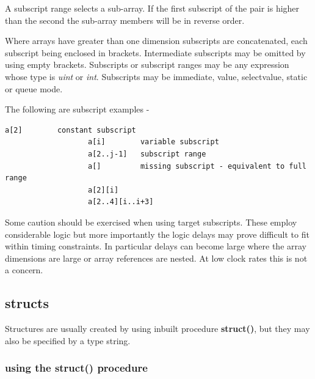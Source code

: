                A subscript range selects a sub-array.
                If the first subscript of the pair is higher than the second
                the sub-array members will be in reverse order.

                Where arrays have greater than one dimension subscripts are
                concatenated, each subscript being enclosed in brackets.
                Intermediate subscripts may be omitted by using empty brackets.
                Subscripts or subscript ranges may be any expression whose type
                is {\em uint} or {\em int}. Subscripts may be immediate, value,
                selectvalue, static or queue mode.
                             
                The following are subscript examples -
                \begin{lstlisting}[gobble=16, language=threepl]
                   a[2]        constant subscript
                   a[i]        variable subscript
                   a[2..j-1]   subscript range
                   a[]         missing subscript - equivalent to full range
                   a[2][i]
                   a[2..4][i..i+3]
                \end{lstlisting}

                Some caution should be exercised when using target subscripts.
                These employ considerable logic but more importantly the logic
                delays may prove difficult to fit within timing constraints. In
                particular delays can become large where the array dimensions
                are large or array references are nested. At low clock rates
                this is not a concern.



        \subsection{structs}\label{sec:ssecstructs}
        
            Structures are usually created by using inbuilt procedure
            {\bf struct()}, but they may also be specified by
            a type string.

            \subsubsection{using the struct() procedure}
            

